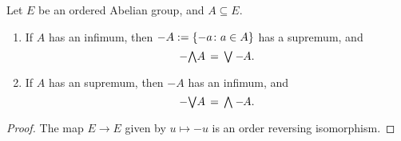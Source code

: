 %
%
\begin{lem}
\label{L:oag-minus-preserves}
Let $E$ be an ordered Abelian group,
and $A\subseteq E$.
\begin{enumerate}
\item
If $A$ has an infimum,
then $-A:= \{-a\colon a\in A\}$
has a supremum,
and 
\begin{equation*}
-\textstyle{\bigwedge} A \,=\, \textstyle{\bigvee} -\hspace{-3pt}A.
\end{equation*}
\item
If $A$ has an supremum,
then $-A$
has an infimum, and
\begin{equation*}
-\textstyle{\bigvee} A \,=\, \textstyle{\bigwedge} -\hspace{-3pt}A.
\end{equation*}
\end{enumerate}
\end{lem}
\begin{proof}
The map $E\rightarrow E$ given by
$u\mapsto -u$ is an order reversing isomorphism.
\end{proof}

